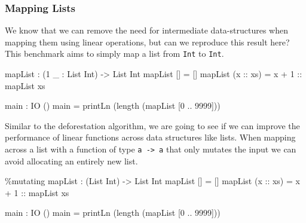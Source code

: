 \documentclass[
]{article}
\newenvironment{Shaded}{}{}
\newcommand{\DataTypeTok}[1]{\textcolor[rgb]{0.56,0.13,0.00}{#1}}
\newcommand{\DecValTok}[1]{\textcolor[rgb]{0.25,0.63,0.44}{#1}}
\newcommand{\FunctionTok}[1]{\textcolor[rgb]{0.02,0.16,0.49}{#1}}
\newcommand{\NormalTok}[1]{#1}
\newcommand{\OperatorTok}[1]{\textcolor[rgb]{0.40,0.40,0.40}{#1}}
\newcommand{\OtherTok}[1]{\textcolor[rgb]{0.00,0.44,0.13}{#1}}
\begin{document}
\hypertarget{mapping-lists}{%
\subsubsection{Mapping Lists}\label{mapping-lists}}

We know that we can remove the need for intermediate data-structures
when mapping them using linear operations\cite{deforestation}, but can
we reproduce this result here? This benchmark aims to simply map a list
from \texttt{Int} to \texttt{Int}.

\begin{Shaded}
\begin{Highlighting}[]
\NormalTok{mapList }\OperatorTok{:}\NormalTok{ (}\DecValTok{1}\NormalTok{ \_ }\OperatorTok{:} \DataTypeTok{List} \DataTypeTok{Int}\NormalTok{) }\OtherTok{{-}\textgreater{}} \DataTypeTok{List} \DataTypeTok{Int}
\NormalTok{mapList [] }\OtherTok{=}\NormalTok{ []}
\NormalTok{mapList (}\OtherTok{x ::}\NormalTok{ xs) }\OtherTok{=}\NormalTok{ x }\OperatorTok{+} \DecValTok{1}\OtherTok{ ::}\NormalTok{ mapList xs}

\NormalTok{main }\OperatorTok{:} \DataTypeTok{IO}\NormalTok{ ()}
\NormalTok{main }\OtherTok{=}\NormalTok{ printLn (}\FunctionTok{length}\NormalTok{ (mapList [}\DecValTok{0} \OperatorTok{..} \DecValTok{9999}\NormalTok{]))}
\end{Highlighting}
\end{Shaded}

Similar to the deforestation algorithm, we are going to see if we can
improve the performance of linear functions across data structures like
lists. When mapping across a list with a function of type
\texttt{a\ -\textgreater{}\ a} that only mutates the input we can avoid
allocating an entirely new list.

\begin{Shaded}
\begin{Highlighting}[]
\OperatorTok{\%}\NormalTok{mutating}
\NormalTok{mapList }\OperatorTok{:}\NormalTok{ (}\DataTypeTok{List} \DataTypeTok{Int}\NormalTok{) }\OtherTok{{-}\textgreater{}} \DataTypeTok{List} \DataTypeTok{Int}
\NormalTok{mapList [] }\OtherTok{=}\NormalTok{ []}
\NormalTok{mapList (}\OtherTok{x ::}\NormalTok{ xs) }\OtherTok{=}\NormalTok{ x }\OperatorTok{+} \DecValTok{1}\OtherTok{ ::}\NormalTok{ mapList xs}

\NormalTok{main }\OperatorTok{:} \DataTypeTok{IO}\NormalTok{ ()}
\NormalTok{main }\OtherTok{=}\NormalTok{ printLn (}\FunctionTok{length}\NormalTok{ (mapList [}\DecValTok{0} \OperatorTok{..} \DecValTok{9999}\NormalTok{]))}
\end{Highlighting}
\end{Shaded}
\end{document}
